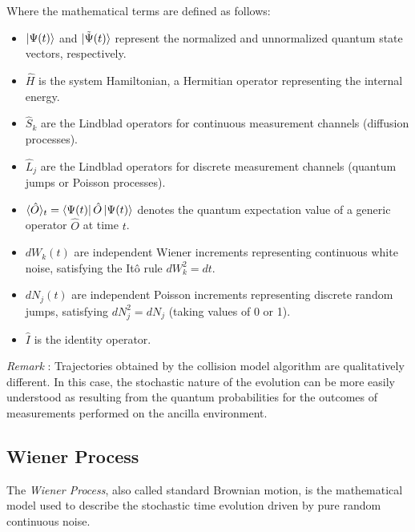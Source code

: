 \documentclass[a4paper,12pt]{article}
\begin{document}
	Where the mathematical terms are defined as follows:
	\begin{itemize}
		\item $\ket{\Psi(t)}$ and $\ket{\tilde{\Psi}(t)}$ represent the normalized and unnormalized quantum state vectors, respectively.
		\item $\hat{H}$ is the system Hamiltonian, a Hermitian operator representing the internal energy.
		\item $\hat{S}_k$ are the Lindblad operators for continuous measurement channels (diffusion processes).
		\item $\hat{L}_j$ are the Lindblad operators for discrete measurement channels (quantum jumps or Poisson processes).
		\item $\langle \hat{O} \rangle_t = \bra{\Psi(t)} \hat{O} \ket{\Psi(t)}$ denotes the quantum expectation value of a generic operator $\hat{O}$ at time $t$.
		\item $dW_k(t)$ are independent Wiener increments representing continuous white noise, satisfying the Itô rule $dW_k^2 = dt$.
		\item $dN_j(t)$ are independent Poisson increments representing discrete random jumps, satisfying $dN_j^2 = dN_j$ (taking values of 0 or 1).
		\item $\hat{I}$ is the identity operator.
	\end{itemize}
	
	\textit{Remark} : Trajectories obtained by the collision model algorithm are qualitatively different. In this case, the stochastic
	nature of the evolution can be more easily understood as resulting from the quantum probabilities for the
	outcomes of measurements performed on the ancilla environment.
	
	\subsection{Wiener Process}
	\label{sub:Wiener_process}
	The \textit{Wiener Process}, also called standard Brownian motion, is the mathematical model used to describe the stochastic time evolution driven by pure random continuous noise.
	
\end{document}
